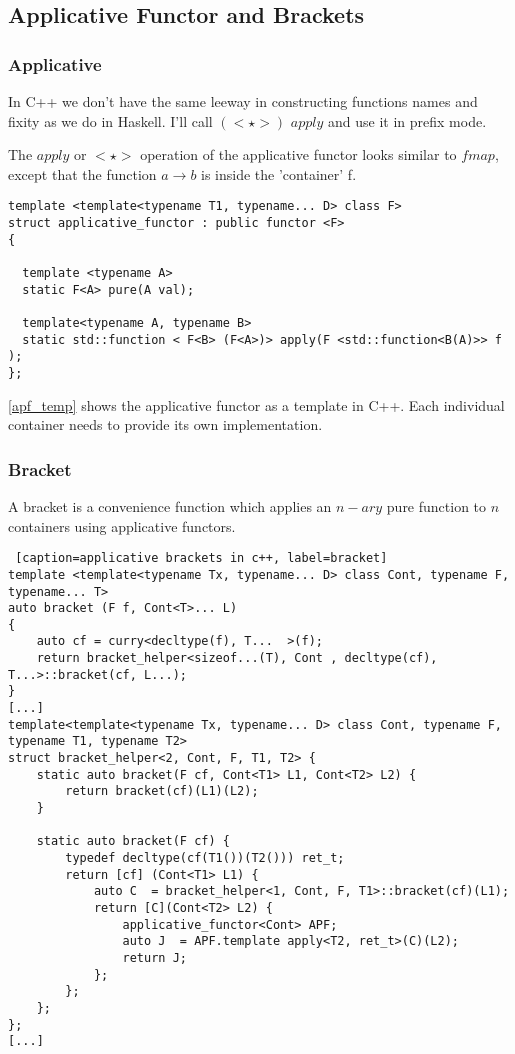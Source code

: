 \documentclass[12pt,fleqn]{article}
\begin{document}
%
%
\subsection{Applicative Functor and Brackets}
%
%
%
\subsubsection{Applicative}
%
%
In C++ we don't have the same leeway in  constructing functions names and fixity as we do in Haskell.
I'll call $(<\star>)$ $apply$ and use it in prefix mode.

The $apply$ or $<\star>$ operation of the applicative functor looks similar to $fmap$, except that the function $a \rightarrow b$ is inside the 'container' f.


%
%
%
\begin{minipage}{\linewidth}
\begin{lstlisting}[caption=applicative functor template in C++, label=apf_temp]
template <template<typename T1, typename... D> class F> 
struct applicative_functor : public functor <F>
{

  template <typename A> 
  static F<A> pure(A val);

  template<typename A, typename B>
  static std::function < F<B> (F<A>)> apply(F <std::function<B(A)>> f );
};
\end{lstlisting}
\end{minipage}
%
%
%

\ref{apf_temp} shows the applicative functor as a template in C++. 
Each individual container needs to provide its own implementation. 
%
%
%

%
%
%
\subsubsection{Bracket}
%
%

A bracket is a convenience function which applies an $n-ary$ pure function to $n$ containers using applicative functors.

%
%
%
\begin {lstlisting} [caption=applicative brackets in c++, label=bracket]
template <template<typename Tx, typename... D> class Cont, typename F, typename... T> 
auto bracket (F f, Cont<T>... L) 
{
	auto cf = curry<decltype(f), T...  >(f);	
	return bracket_helper<sizeof...(T), Cont , decltype(cf), T...>::bracket(cf, L...);
} 
[...]
template<template<typename Tx, typename... D> class Cont, typename F, typename T1, typename T2>
struct bracket_helper<2, Cont, F, T1, T2> {
	static auto bracket(F cf, Cont<T1> L1, Cont<T2> L2) {
		return bracket(cf)(L1)(L2);
	}

	static auto bracket(F cf) {
		typedef decltype(cf(T1())(T2())) ret_t;
		return [cf] (Cont<T1> L1) {
			auto C  = bracket_helper<1, Cont, F, T1>::bracket(cf)(L1);
			return [C](Cont<T2> L2) { 
				applicative_functor<Cont> APF;
				auto J  = APF.template apply<T2, ret_t>(C)(L2);
				return J;
			};
		};
	};
};
[...]
\end{lstlisting}
%
%
%
%
%
\end{document}
